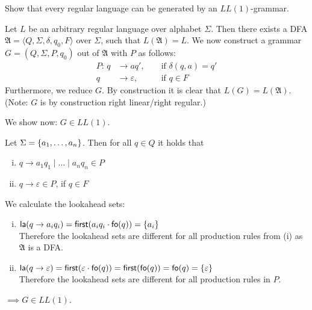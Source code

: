 \begin{exercise}{10}
    Show that every regular language can be generated by an $LL(1)$-grammar.
\end{exercise}

\begin{solution}
    Let $L$ be an arbitrary regular language over alphabet $\Sigma$.
    Then there exists a DFA $\mathfrak{A} = \langle Q, \Sigma, \delta, q_0, F \rangle$ over $\Sigma$, such that $L(\mathfrak{A}) = L$.
    We now construct a grammar $G = (Q, \Sigma, P, q_0)$ out of $\mathfrak{A}$ with $P$ as follows:
    \begin{alignat*}{2}
        P: \, q &\rightarrow aq',& &\text{ if }\delta(q, a) = q'\\
              q &\rightarrow \varepsilon, &&\text{ if }q \in F
    \end{alignat*}
    Furthermore, we reduce $G$.
    By construction it is clear that $L(G) = L(\mathfrak{A})$. (Note: $G$ is by construction right linear/right regular.)

    We show now: $G \in LL(1)$.

    Let $\Sigma = \left\{ a_1, \ldots, a_n \right\}$.
    Then for all $q \in Q$ it holds that
    \begin{enumerate}[(i)]
      \item $q \rightarrow a_1 q_1 \mid \ldots \mid a_n q_n \in P$
      \item $q \rightarrow \varepsilon \in P$, if $q \in F$
    \end{enumerate}

    We calculate the lookahead sets:
    \begin{enumerate}[(i)]
      \item $\textsf{la}(q\rightarrow a_i q_i) = \textsf{first}(a_i q_i \cdot \textsf{fo}(q)) = \left\{ a_i  \right\}$\\
        Therefore the lookahead sets are different for all production rules from (i) as $\mathfrak{A}$ is a DFA.
      \item $\textsf{la}(q \rightarrow \varepsilon) = \textsf{first}(\varepsilon \cdot \textsf{fo}(q)) = \textsf{first}(\textsf{fo}(q)) = \textsf{fo}(q) = \left\{ \varepsilon \right\}$\\
        Therefore the lookahead sets are different for all production rules in $P$.
    \end{enumerate}
    $\implies G \in LL(1)$.
\end{solution}
